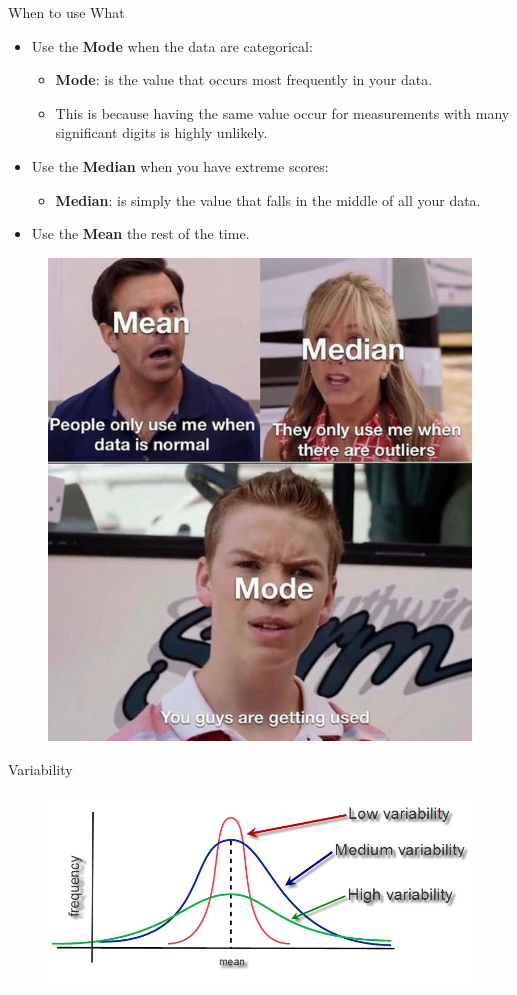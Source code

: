 \documentclass[
  ignorenonframetext,
]{beamer}
\providecommand{\tightlist}{%
  \setlength{\itemsep}{0pt}\setlength{\parskip}{0pt}}
\begin{document}
\begin{frame}{When to use What}
\label{when-to-use-what}
\begin{itemize}
\tightlist
\item
  Use the \textbf{Mode} when the data are categorical:

  \begin{itemize}
  \tightlist
  \item
    \textbf{Mode}: is the value that occurs most frequently in your
    data.\\
  \item
    This is because having the same value occur for measurements with
    many significant digits is highly unlikely.
  \end{itemize}
\end{itemize}

\begin{itemize}
\tightlist
\item
  Use the \textbf{Median} when you have extreme scores:

  \begin{itemize}
  \tightlist
  \item
    \textbf{Median}: is simply the value that falls in the middle of all
    your data.
  \end{itemize}
\end{itemize}

\begin{itemize}
\tightlist
\item
  Use the \textbf{Mean} the rest of the time.
\end{itemize}

\begin{figure}
\includegraphics[width=0.25\linewidth]{fig/CnetralTendency} \end{figure}
\end{frame}

\begin{frame}{Variability}
\label{variability}
\begin{figure}
\includegraphics[width=0.25\linewidth]{fig/variability} \end{figure}
\end{frame}
\end{document}
